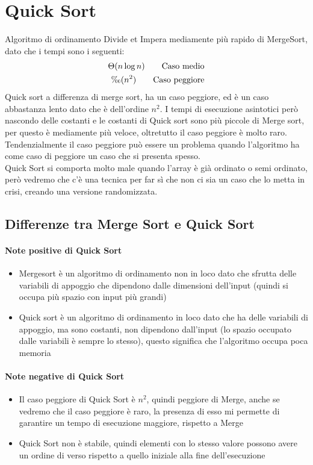 \section{Quick Sort}
Algoritmo di ordinamento Divide et Impera mediamente più rapido di MergeSort, dato che i tempi sono
i seguenti:
\begin{align*}
    \Theta(n\log n) \qquad \text{Caso medio}\\
    \O(n^2) \qquad \text{Caso peggiore}
\end{align*}
Quick sort a differenza di merge sort, ha un caso peggiore, ed è un caso abbastanza lento dato 
che è dell'ordine $n^2$. I tempi di esecuzione asintotici però nascondo delle costanti e le costanti
di Quick sort sono più piccole di Merge sort, per questo è mediamente più veloce, oltretutto il caso peggiore
è molto raro.\\
Tendenzialmente il caso peggiore può essere un problema quando l'algoritmo ha come caso di peggiore
un caso che si presenta spesso.\\
Quick Sort si comporta molto male quando l'array è già ordinato o semi ordinato, però vedremo che c'è una tecnica
per far sì che non ci sia un caso che lo metta in crisi, creando una versione randomizzata.
\subsection{Differenze tra Merge Sort e Quick Sort}
\paragraph*{Note positive di Quick Sort}
\begin{itemize}
    \item Mergesort è un algoritmo di ordinamento non in loco dato che sfrutta delle variabili di
    appoggio che dipendono dalle dimensioni dell'input (quindi si occupa più spazio con input più grandi)
    \item Quick sort è un algoritmo di ordinamento in loco dato che ha delle variabili di appoggio, ma sono costanti,
    non dipendono dall'input (lo spazio occupato dalle variabili è sempre lo stesso), questo significa che
    l'algoritmo occupa poca memoria
\end{itemize}
\paragraph*{Note negative di Quick Sort}
\begin{itemize}
    \item Il caso peggiore di Quick Sort è $n^2$, quindi peggiore di Merge, anche se vedremo che il caso peggiore è
    raro, la presenza di esso mi permette di garantire un tempo di esecuzione maggiore, rispetto a Merge
    \item Quick Sort non è stabile, quindi elementi con lo stesso valore possono avere un ordine di verso
    rispetto a quello iniziale alla fine dell'esecuzione
\end{itemize}
